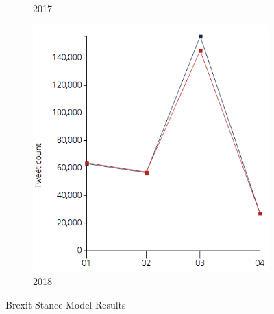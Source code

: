 \documentclass[11pt]{report}
\begin{document}
\begin{figure}[H]
\begin{subfigure}[b]{0.33\textwidth}
                \caption{2017}
                \label{fig:gull2}
        \end{subfigure}%
        \begin{subfigure}[b]{0.30\textwidth}
                \includegraphics[width=\linewidth]{images/2018-brexit.png}
                \caption{2018}
                \label{fig:tiger}
        \end{subfigure}%

        \caption{Brexit Stance Model Results}\label{fig:brexit-results}
\end{figure}
\end{document}

